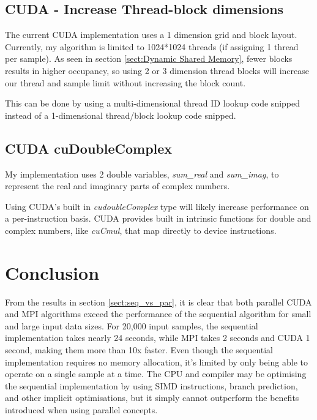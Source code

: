 \documentclass[11pt,a4paper]{article}
\begin{document}
\subsection{CUDA - Increase Thread-block dimensions}\label{sect:improv_cuda_block}
The current CUDA implementation uses a 1 dimension grid and block layout. Currently, my algorithm is limited to 1024*1024 threads (if assigning 1 thread per sample). As seen in section \ref{sect:Dynamic Shared Memory}, fewer blocks results in higher occupancy, so using 2 or 3 dimension thread blocks will increase our thread and sample limit without increasing the block count. 

This can be done by using a multi-dimensional thread ID lookup code snipped instead of a 1-dimensional thread/block lookup code snipped.

\subsection{CUDA cuDoubleComplex}
My implementation uses 2 double variables, \textit{sum\_real} and \textit{sum\_imag}, to represent the real and imaginary parts of complex numbers.

Using CUDA's built in \textit{cudoubleComplex} type will likely increase performance on a per-instruction basis. CUDA provides built in intrinsic functions for double and complex numbers, like \textit{cuCmul}, that map directly to device instructions.

\section{Conclusion}
From the results in section \ref{sect:seq_vs_par}, it is clear that both parallel CUDA and MPI algorithms exceed the performance of the sequential algorithm for small and large input data sizes. For 20,000 input samples, the sequential implementation takes nearly 24 seconds, while MPI takes 2 seconds and CUDA 1 second, making them more than 10x faster. Even though the sequential implementation requires no memory allocation, it's limited by only being able to operate on a single sample at a time. The CPU and compiler may be optimising the sequential implementation by using SIMD instructions, branch prediction, and other implicit optimisations, but it simply cannot outperform the benefits introduced when using parallel concepts.
\end{document}
